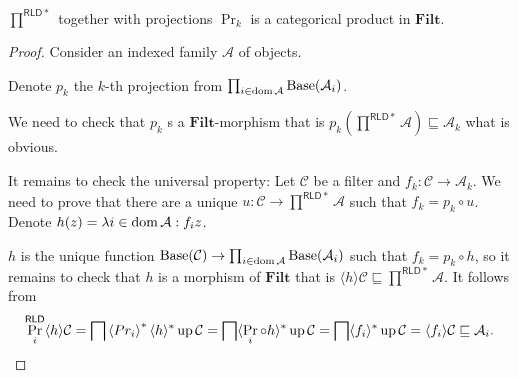 \begin{thm}
  $\prod^{\mathsf{RLD} \ast}$ together with projections $\Pr_k$ is a
  categorical product in $\mathbf{Filt}$.
\end{thm}

\begin{proof}
  Consider an indexed family $\mathcal{A}$ of objects.
  
  Denote $p_k$ the $k$-th projection from $\prod_{i \in \operatorname{dom}
  \mathcal{A}} \operatorname{Base} (\mathcal{A}_i)$.
  
  We need to check that $p_k$ s a $\mathbf{Filt}$-morphism that is
  $p_k \left( \prod^{\mathsf{RLD} \ast} \mathcal{A} \right) \sqsubseteq
  \mathcal{A}_k$ what is obvious.
  
  It remains to check the universal property: Let $\mathcal{C}$ be a filter
  and $f_k : \mathcal{C} \rightarrow \mathcal{A}_k$. We need to prove that
  there are a unique $u : \mathcal{C} \rightarrow \prod^{\mathsf{RLD}
  \ast} \mathcal{A}$ such that $f_k = p_k \circ u$. Denote $h (z) = \lambda i
  \in \operatorname{dom} \mathcal{A} : f_i z$.
  
  $h$ is the unique function $\operatorname{Base} (\mathcal{C}) \rightarrow \prod_{i
  \in \operatorname{dom} \mathcal{A}} \operatorname{Base} (\mathcal{A}_i)$ such that $f_k =
  p_k \circ h$, so it remains to check that $h$ is a morphism of
  $\mathbf{Filt}$ that is $\langle h \rangle \mathcal{C} \sqsubseteq
  \prod^{\mathsf{RLD} \ast} \mathcal{A}$. It follows from
  \[ \Pr^{\mathsf{RLD}}_i \langle h \rangle \mathcal{C} = \bigsqcap
     \left\langle Pr_i\right\rangle ^{\ast} \langle h \rangle^{\ast} \operatorname{up}
     \mathcal{C} = \bigsqcap \langle \Pr_i \circ h \rangle^{\ast} \operatorname{up}
     \mathcal{C} = \bigsqcap \langle f_i \rangle^{\ast} \operatorname{up} \mathcal{C}
     = \langle f_i \rangle \mathcal{C} \sqsubseteq \mathcal{A}_i . \]
\end{proof}